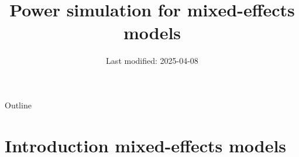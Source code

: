\documentclass[aspectratio=169]{beamer}
\title{Power simulation for mixed-effects models}
\date{Last modified: 2025-04-08}
\begin{document}
\begin{frame}{}
\thispagestyle{empty}
\titlepage
\end{frame}

\begin{frame}{Outline}
\tableofcontents
\end{frame}

\section[Introduction]{Introduction mixed-effects models}

% 
\end{document}
